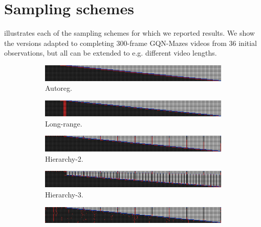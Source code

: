 \section{Sampling schemes}
 illustrates each of the sampling schemes for which we reported results. We show the versions adapted to completing 300-frame GQN-Mazes videos from 36 initial observations, but all can be extended to e.g. different video lengths.
\begin{figure}[t]
    \centering
    \begin{subfigure}[t]{\textwidth}
        \includegraphics[width=\textwidth]{figs/fdm/inference-modes/sample_vis_autoreg_T=300_sampling_10_out_of_20_red_blue_flipped.png}
        \caption{Autoreg.}
    \end{subfigure}
    \begin{subfigure}[t]{\textwidth}
        \includegraphics[width=\textwidth]{figs/fdm/inference-modes/sample_vis_mixed-autoreg-independent_T=300_sampling_10_out_of_20_red_blue_flipped.png}
        \caption{Long-range.}
    \end{subfigure}
    \begin{subfigure}[t]{\textwidth}
        \includegraphics[width=\textwidth]{figs/fdm/inference-modes/sample_vis_hierarchy-2_T=300_sampling_10_out_of_20_red_blue_flipped.png}
        \caption{Hierarchy-2.}
    \end{subfigure}
    \begin{subfigure}[t]{\textwidth}
        \includegraphics[width=\textwidth]{figs/fdm/inference-modes/sample_vis_hierarchy-3_T=300_sampling_10_out_of_20_red_blue_flipped.png}
        \caption{Hierarchy-3.}
    \end{subfigure}
    \begin{subfigure}[t]{\textwidth}
        \includegraphics[width=\textwidth]{figs/fdm/inference-modes/sample_vis_adaptive-hierarchy-2_T=300_sampling_10_out_of_20_index-0_red_blue_flipped.png}

\end{subfigure}
\end{figure}
